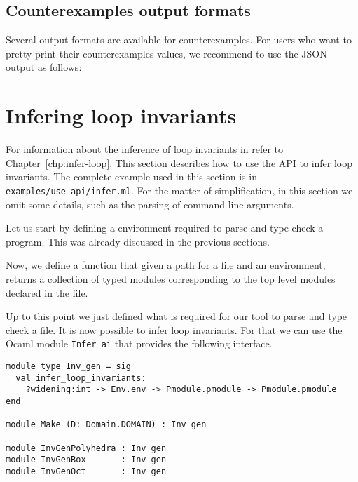 \subsection{Counterexamples output formats}

Several output formats are available for counterexamples. For users who want to
pretty-print their counterexamples values, we recommend to use the JSON output
as follows:



\section{Infering loop invariants}
\label{sec:infer-loop-api}

For information about the inference of loop invariants in \why refer
to Chapter~\ref{chp:infer-loop}. This section describes how to use the
API to infer loop invariants. The complete example used in this
section is in \verb|examples/use_api/infer.ml|. For the matter of
simplification, in this section we omit some details, such as the
parsing of command line arguments.

Let us start by defining a \why environment required to parse and type
check a \whyml program. This was already discussed in the previous
sections.



Now, we define a function that given a path for a file and an \why
environment, returns a collection of typed modules corresponding to
the top level modules declared in the file.



Up to this point we just defined what is required for our tool to
parse and type check a \whyml file. It is now possible to infer loop
invariants. For that we can use the Ocaml module \verb|Infer_ai| that
provides the following interface.

\begin{verbatim}
module type Inv_gen = sig
  val infer_loop_invariants:
    ?widening:int -> Env.env -> Pmodule.pmodule -> Pmodule.pmodule
end

module Make (D: Domain.DOMAIN) : Inv_gen

module InvGenPolyhedra : Inv_gen
module InvGenBox       : Inv_gen
module InvGenOct       : Inv_gen
\end{verbatim}

